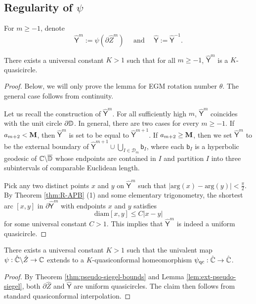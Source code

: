 \documentclass{amsart}
\begin{document}
\subsection{Regularity of $\psi$}

For $m \geq -1$, denote 
\[
    \hat{\mathsf{Y}}^m := \psi(\partial \hat{Z}^{m})
    \quad \text{ and } \quad
    \hat{\mathsf{Y}} := \hat{\mathsf{Y}}^{-1}.
\]

\begin{lemma}
\label{lem:ext-pseudo-siegel}
    There exists a universal constant $K>1$ such that for all $m \geq -1$, $\hat{\mathsf{Y}}^m$ is a $K$-quasicircle.
\end{lemma}

\begin{proof}
    Below, we will only prove the lemma for EGM rotation number $\theta$. The general case follows from continuity.
    
    Let us recall the construction of $\hat{\mathsf{Y}}^m$. For all sufficiently high $m$, $\hat{\mathsf{Y}}^m$ coincides with the unit circle $\partial \mathbb{D}$. In general, there are two cases for every $m \geq -1$.
    If $a_{m+2}< \mathbf{M}$, then $\hat{\mathsf{Y}}^m$ is set to be equal to $\hat{\mathsf{Y}}^{m+1}$. If $a_{m+2} \geq \mathbf{M}$, then we set $\hat{\mathsf{Y}}^m$ to be the external boundary of $\hat{\mathsf{Y}}^{m+1} \cup \bigcup_{I \in \mathcal{D}_m} \mathsf{b}_I$, where each $\mathsf{b}_I$ is a hyperbolic geodesic of $\mathbb{C} \backslash \overline{\mathbb{D}}$ whose endpoints are contained in $I$ and partition $I$ into three subintervals of comparable Euclidean length.
    
    Pick any two distinct points $x$ and $y$ on $\hat{\mathsf{Y}}^m$ such that $|\text{arg}(x)-\text{arg}(y)|< \frac{\pi}{2}$. 
    By Theorem \ref{thm:R-APB} (1) and some elementary trigonometry, the shortest arc $[x,y]$ in $\partial \hat{\mathsf{Y}}^m$ with endpoints $x$ and $y$ satisfies
    \[
        \text{diam}[x,y] \leq C |x-y|
    \]
    for some universal constant $C>1$. 
    This implies that $\hat{\mathsf{Y}}^m$ is indeed a uniform quasicircle.
\end{proof}

\begin{corollary}
\label{cor:new-psi}
    There exists a universal constant $K>1$ such that the univalent map $\psi : \hat{\mathbb{C}} \backslash \hat{Z} \to \mathbb{C}$ extends to a $K$-quasiconformal homeomorphism $\psi_{\textnormal{qc}} : \hat{\mathbb{C}} \to \hat{\mathbb{C}}$.
\end{corollary}

\begin{proof}
    By Theorem \ref{thm:pseudo-siegel-bounds} and Lemma \ref{lem:ext-pseudo-siegel}, both $\partial \hat{Z}$ and $\hat{\mathsf{Y}}$ are uniform quasicircles. 
    The claim then follows from standard quasiconformal interpolation.
\end{proof}
\end{document}
